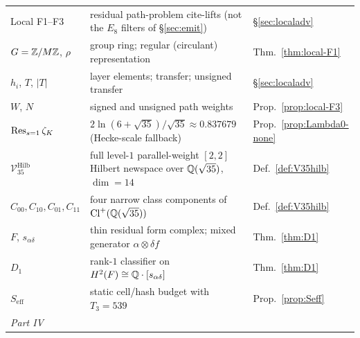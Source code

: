 \begin{center}
\begin{longtable}{p{3.2cm}p{9.3cm}p{2.4cm}}
Local F1--F3 & residual path-problem cite-lifts (not the $E_8$ filters of \S\ref{sec:emit}) & \S\ref{sec:localadv}\\
$G=\mathbb{Z}/M\mathbb{Z}$, $\rho$ & group ring; regular (circulant) representation & Thm.~\ref{thm:local-F1}\\
$h_i$, $T$, $|T|$ & layer elements; transfer; unsigned transfer & \S\ref{sec:localadv}\\
$W$, $N$ & signed and unsigned path weights & Prop.~\ref{prop:local-F3}\\
$\operatorname*{Res}_{s=1}\zeta_K$ & $2\ln(6+\sqrt{35})/\sqrt{35}\approx0.837679$ (Hecke-scale fallback) & Prop.~\ref{prop:Lambda0-none}\\
$\mathcal V_{35}^{\mathrm{Hilb}}$ & full level-$1$ parallel-weight $[2,2]$ Hilbert newspace over $\mathbb{Q}(\sqrt{35})$, $\dim=14$ & Def.~\ref{def:V35hilb}\\
$C_{00},C_{10},C_{01},C_{11}$ & four narrow class components of $\mathrm{Cl}^+(\mathbb{Q}(\sqrt{35}))$ & Def.~\ref{def:V35hilb}\\
$F$, $s_{\alpha\delta}$ & thin residual form complex; mixed generator $\alpha\otimes\delta f$ & Thm.~\ref{thm:D1}\\
$D_1$ & rank-$1$ classifier on $H^2(F)\cong\mathbb{Q}\cdot[s_{\alpha\delta}]$ & Thm.~\ref{thm:D1}\\
$S_{\mathrm{eff}}$ & static cell/hash budget with $T_3=539$ & Prop.~\ref{prop:Seff}\\
\multicolumn{3}{l}{\emph{Part IV}}\\


\end{longtable}
\end{center}
